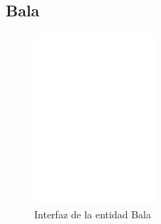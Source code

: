 \subsection{Bala}
\label{bullet}

\begin{figure}[H]
	\centering
	\includegraphics[width=0.4\textwidth, angle=-90] {bullet_block.pdf}
	\caption{Interfaz de la entidad Bala}\label{fig:bullet_block}
\end{figure}